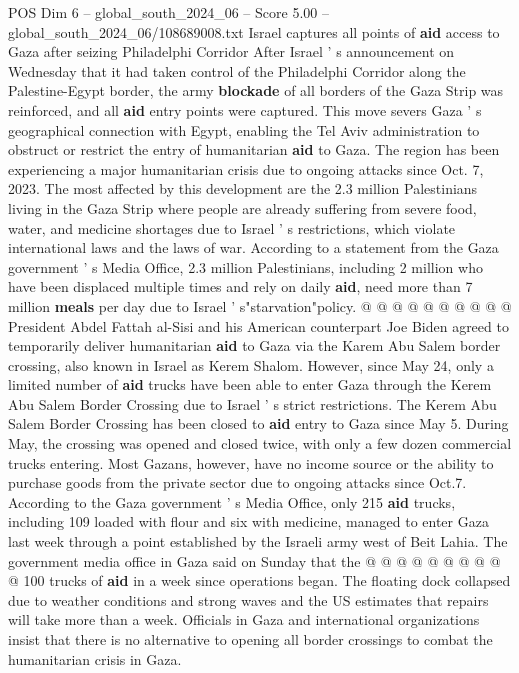 \begin{textsample}{POS Dim 6 – global\_south\_2024\_06 – Score 5.00 – global\_south\_2024\_06/108689008.txt}  \label{ex:f6_pos_180}
Israel captures all points of \textbf{aid} access to Gaza after seizing Philadelphi Corridor After Israel ' s announcement on Wednesday that it had taken control of the Philadelphi Corridor along the Palestine-Egypt border, the army \textbf{blockade} of all borders of the Gaza Strip was reinforced, and all \textbf{aid} entry points were captured.
This move severs Gaza ' s geographical connection with Egypt, enabling the Tel Aviv administration to obstruct or restrict the entry of humanitarian \textbf{aid} to Gaza.
The region has been experiencing a major humanitarian crisis due to ongoing attacks since Oct. 7, 2023.
The most affected by this development are the 2.3 million Palestinians living in the Gaza Strip where people are already suffering from severe food, water, and medicine shortages due to Israel ' s restrictions, which violate international laws and the laws of war.
According to a statement from the Gaza government ' s Media Office, 2.3 million Palestinians, including 2 million who have been displaced multiple times and rely on daily \textbf{aid}, need more than 7 million \textbf{meals} per day due to Israel ' s"starvation"policy. @ @ @ @ @ @ @ @ @ @ President Abdel Fattah al-Sisi and his American counterpart Joe Biden agreed to temporarily deliver humanitarian \textbf{aid} to Gaza via the Karem Abu Salem border crossing, also known in Israel as Kerem Shalom.
However, since May 24, only a limited number of \textbf{aid} trucks have been able to enter Gaza through the Kerem Abu Salem Border Crossing due to Israel ' s strict restrictions.
The Kerem Abu Salem Border Crossing has been closed to \textbf{aid} entry to Gaza since May 5.
During May, the crossing was opened and closed twice, with only a few dozen commercial trucks entering.
Most Gazans, however, have no income source or the ability to purchase goods from the private sector due to ongoing attacks since Oct.7.
According to the Gaza government ' s Media Office, only 215 \textbf{aid} trucks, including 109 loaded with flour and six with medicine, managed to enter Gaza last week through a point established by the Israeli army west of Beit Lahia.
The government media office in Gaza said on Sunday that the @ @ @ @ @ @ @ @ @ @ 100 trucks of \textbf{aid} in a week since operations began.
The floating dock collapsed due to weather conditions and strong waves and the US estimates that repairs will take more than a week.
Officials in Gaza and international organizations insist that there is no alternative to opening all border crossings to combat the humanitarian crisis in Gaza.

\end{textsample}

